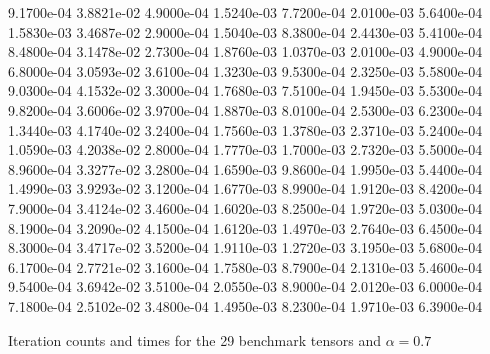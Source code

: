 \documentclass[10pt]{paper}
\begin{document}
\begin{table}
{   9.1700e-04   3.8821e-02   4.9000e-04   1.5240e-03   7.7200e-04   2.0100e-03   5.6400e-04
   1.5830e-03   3.4687e-02   2.9000e-04   1.5040e-03   8.3800e-04   2.4430e-03   5.4100e-04
   8.4800e-04   3.1478e-02   2.7300e-04   1.8760e-03   1.0370e-03   2.0100e-03   4.9000e-04
   6.8000e-04   3.0593e-02   3.6100e-04   1.3230e-03   9.5300e-04   2.3250e-03   5.5800e-04
   9.0300e-04   4.1532e-02   3.3000e-04   1.7680e-03   7.5100e-04   1.9450e-03   5.5300e-04
   9.8200e-04   3.6006e-02   3.9700e-04   1.8870e-03   8.0100e-04   2.5300e-03   6.2300e-04
   1.3440e-03   4.1740e-02   3.2400e-04   1.7560e-03   1.3780e-03   2.3710e-03   5.2400e-04
   1.0590e-03   4.2038e-02   2.8000e-04   1.7770e-03   1.7000e-03   2.7320e-03   5.5000e-04
   8.9600e-04   3.3277e-02   3.2800e-04   1.6590e-03   9.8600e-04   1.9950e-03   5.4400e-04
   1.4990e-03   3.9293e-02   3.1200e-04   1.6770e-03   8.9900e-04   1.9120e-03   8.4200e-04
   7.9000e-04   3.4124e-02   3.4600e-04   1.6020e-03   8.2500e-04   1.9720e-03   5.0300e-04
   8.1900e-04   3.2090e-02   4.1500e-04   1.6120e-03   1.4970e-03   2.7640e-03   6.4500e-04
   8.3000e-04   3.4717e-02   3.5200e-04   1.9110e-03   1.2720e-03   3.1950e-03   5.6800e-04
   6.1700e-04   2.7721e-02   3.1600e-04   1.7580e-03   8.7900e-04   2.1310e-03   5.4600e-04
   9.5400e-04   3.6942e-02   3.5100e-04   2.0550e-03   8.9000e-04   2.0120e-03   6.0000e-04
   7.1800e-04   2.5102e-02   3.4800e-04   1.4950e-03   8.2300e-04   1.9710e-03   6.3900e-04    
   }
	\caption{Iteration counts and times for the 29 benchmark tensors and $\alpha = 0.7$} \label{firsttable}
\end{table}
\end{document}
